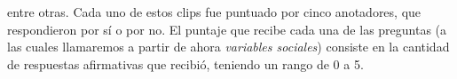 entre otras. Cada uno de estos clips fue puntuado por cinco anotadores, que respondieron por sí o por no. El puntaje que recibe cada una de las preguntas (a las cuales llamaremos a partir de ahora \emph{variables sociales}) consiste en la cantidad de respuestas afirmativas que recibió, teniendo un rango de 0 a 5.

